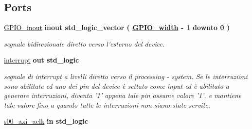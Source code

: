 \subsection*{Ports}
 \begin{DoxyCompactItemize}
\item 
\hypertarget{classmy_g_p_i_o_ga8829699d739ef35a4c5da396ffd38387}{\hyperlink{group___a_x_i-device_ga8829699d739ef35a4c5da396ffd38387}{G\+P\+I\+O\+\_\+inout}  {\bfseries {\bfseries \textcolor{vhdlchar}{inout}\textcolor{vhdlchar}{ }}} {\bfseries \textcolor{vhdlchar}{std\+\_\+logic\+\_\+vector}\textcolor{vhdlchar}{ }\textcolor{vhdlchar}{(}\textcolor{vhdlchar}{ }\textcolor{vhdlchar}{ }\textcolor{vhdlchar}{ }\textcolor{vhdlchar}{ }{\bfseries \hyperlink{group___a_x_i-device_ga0b52ca75e9a6093b2b60d5e851803069}{G\+P\+I\+O\+\_\+width}} \textcolor{vhdlchar}{-\/}\textcolor{vhdlchar}{ } \textcolor{vhdldigit}{1} \textcolor{vhdlchar}{ }\textcolor{vhdlchar}{downto}\textcolor{vhdlchar}{ }\textcolor{vhdlchar}{ } \textcolor{vhdldigit}{0} \textcolor{vhdlchar}{ }\textcolor{vhdlchar}{)}\textcolor{vhdlchar}{ }} }\label{classmy_g_p_i_o_ga8829699d739ef35a4c5da396ffd38387}

\begin{DoxyCompactList}\small\item\em segnale bidirezionale diretto verso l'esterno del device. \end{DoxyCompactList}\item 
\hypertarget{classmy_g_p_i_o_ga5b78f3e3edfaf6e8ec79031b9e631e9d}{\hyperlink{group___a_x_i-device_ga5b78f3e3edfaf6e8ec79031b9e631e9d}{interrupt}  {\bfseries {\bfseries \textcolor{vhdlchar}{out}\textcolor{vhdlchar}{ }}} {\bfseries \textcolor{vhdlchar}{std\+\_\+logic}\textcolor{vhdlchar}{ }} }\label{classmy_g_p_i_o_ga5b78f3e3edfaf6e8ec79031b9e631e9d}

\begin{DoxyCompactList}\small\item\em segnale di interrupt a livelli diretto verso il processing -\/ system. Se le interruzioni sono abilitate ed uno dei pin del device è settato come input ed è abilitato a generare interruzioni, diventa '1' appena tale pin assume valore '1', e mantiene tale valore fino a quando tutte le interruzioni non siano state servite. \end{DoxyCompactList}\item 
\hypertarget{classmy_g_p_i_o_ga037f9e3df8559bfd59db37bcba9cb7a8}{\hyperlink{group___a_x_i-device_ga037f9e3df8559bfd59db37bcba9cb7a8}{s00\+\_\+axi\+\_\+aclk}  {\bfseries {\bfseries \textcolor{vhdlchar}{in}\textcolor{vhdlchar}{ }}} {\bfseries \textcolor{vhdlchar}{std\+\_\+logic}\textcolor{vhdlchar}{ }} }\label{classmy_g_p_i_o_ga037f9e3df8559bfd59db37bcba9cb7a8}


\end{DoxyCompactItemize}
